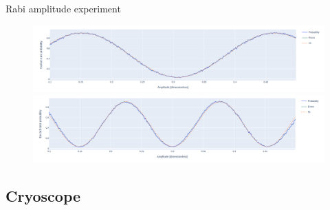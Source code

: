 \documentclass[aspectratio=169,10pt]{beamer}
\begin{document}
\begin{frame}{Rabi amplitude experiment}
    \begin{figure}
    \centering
    \includegraphics[width=\textwidth]{figures/B4.png}
    \vfill
    \includegraphics[width=\textwidth]{figures/B4_90.png}
  \end{figure}
\end{frame}

\subsection{Cryoscope}
\end{document}
